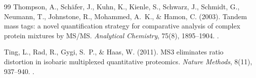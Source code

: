 \documentclass[11pt,oneside]{book}
\begin{document}
\begin{thebibliography}{99}
Thompson, A., Sch{\"a}fer, J., Kuhn, K., Kienle, S., Schwarz, J., Schmidt, G., Neumann, T., Johnstone, R., Mohammed, A.~K., \& Hamon, C. (2003). Tandem mass tags: a novel quantification strategy for comparative analysis of complex protein mixtures by MS/MS. \textit{Analytical Chemistry}, 75(8), 1895--1904. .

Ting, L., Rad, R., Gygi, S.~P., \& Haas, W. (2011). MS3 eliminates ratio distortion in isobaric multiplexed quantitative proteomics. \textit{Nature Methods}, 8(11), 937--940. .

\end{thebibliography}
\end{document}
